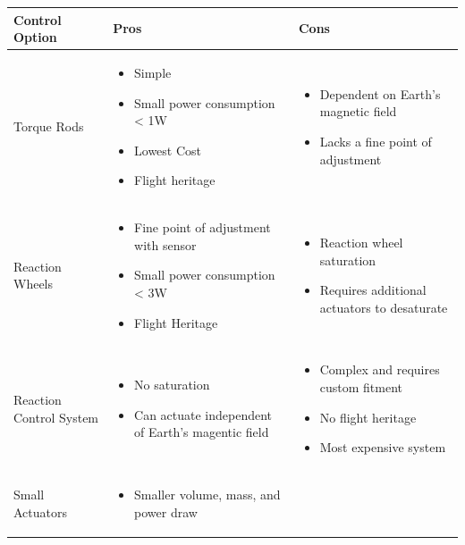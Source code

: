 \begin{table}[H]
\centering
\begin{tabular}{|p{}|p{}|p{}|} 
\hline
\textbf{Control Option} & \textbf{Pros} & \textbf{Cons}
\\
\hline
     Torque Rods
     &
    \begin{itemize}
        \item Simple
        \item Small power consumption < 1W
        \item Lowest Cost
        \item Flight heritage
    \end{itemize}
    &
    \begin{itemize}
        \item Dependent on Earth's magnetic field 
        \item Lacks a fine point of adjustment
    \end{itemize}
    \\
    \hline
     Reaction Wheels
     &
    \begin{itemize}
        \item Fine point of adjustment with sensor
        \item Small power consumption < 3W
        \item Flight Heritage
    \end{itemize}
    &
    \begin{itemize}
        \item Reaction wheel saturation
        \item Requires additional actuators to desaturate
    \end{itemize}
    \\
    \hline
     Reaction Control System
     &
    \begin{itemize}
        \item No saturation 
        \item Can actuate independent of Earth's magentic field
    \end{itemize}
    &
    \begin{itemize}
        \item Complex and requires custom fitment
        \item No flight heritage
        \item Most expensive system
    \end{itemize}
    \\
\hline
     Small Actuators
     &
    \begin{itemize}
        \item Smaller volume, mass, and power draw
    

\end{itemize}
\end{tabular}
\end{table}
